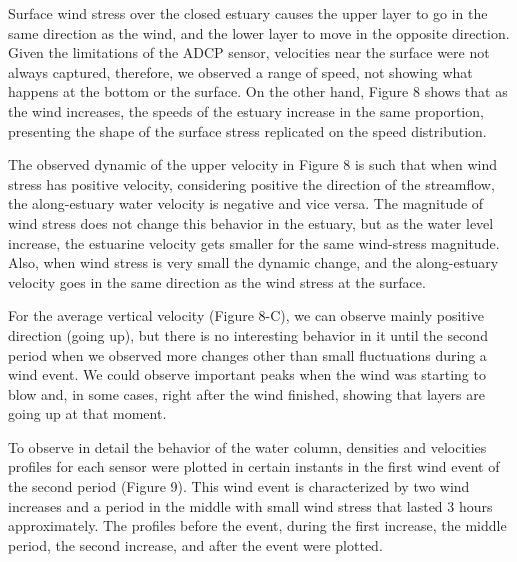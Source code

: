 \documentclass[11pt,letterpaper]{article}
\begin{document}
Surface wind stress over the closed estuary causes the upper layer to go in the same direction as the wind, and the lower layer to move in the opposite direction. Given the limitations of the ADCP sensor, velocities near the surface were not always captured, therefore, we observed a range of speed, not showing what happens at the bottom or the surface. On the other hand, Figure 8 shows that as the wind increases, the speeds of the estuary increase in the same proportion, presenting the shape of the surface stress replicated on the speed distribution.


The observed dynamic of the upper velocity in Figure 8 is such that when wind stress has positive velocity, considering positive the direction of the streamflow, the along-estuary water velocity is negative and vice versa. The magnitude of wind stress does not change this behavior in the estuary, but as the water level increase, the estuarine velocity gets smaller for the same wind-stress magnitude. Also, when wind stress is very small the dynamic change, and the along-estuary velocity goes in the same direction as the wind stress at the surface. 

For the average vertical velocity (Figure 8-C), we can observe mainly positive direction (going up), but there is no interesting behavior in it until the second period when we observed more changes other than small fluctuations during a wind event. We could observe important peaks when the wind was starting to blow and, in some cases, right after the wind finished, showing that layers are going up at that moment.

To observe in detail the behavior of the water column, densities and velocities profiles for each sensor were plotted in certain instants in the first wind event of the second period (Figure 9). This wind event is characterized by two wind increases and a period in the middle with small wind stress that lasted 3 hours approximately. The profiles before the event, during the first increase, the middle period, the second increase, and after the event were plotted.

\end{document}
